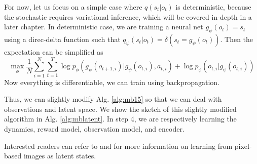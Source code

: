 For now, let us focus on a simple case where $q(s_t|o_t)$ is deterministic, because the stochastic requires variational inference, which will be covered in-depth in a later chapter. In deterministic case, we are training a neural net $g_\psi(o_t) = s_t$ using a direc-delta function such that $q_\psi(s_t|o_t) = \delta(s_t = g_\psi(o_t))$. Then the expectation can be simplified as
\[
\max_\phi \frac{1}{N}\sum_{i=1}^N\sum_{t=1}^T\log p_\phi(g_\psi(o_{t+1,i})|g_\psi(o_{t,i}),a_{t,i}) + \log p_\phi(o_{t,i}|g_\psi(o_{t,i}))
\]
Now everything is differentiable, we can train using backpropagation. 

Thus, we can slightly modify Alg. \ref{alg:mb15} so that we can deal with observations and latent space. We show the sketch of this slightly modified algorithm in Alg. \ref{alg:mblatent}. In step 4, we are respectively learning the dynamics, reward model, observation model, and encoder.


Interested readers can refer to \cite{watter2015embed} and \cite{zhang2018solar} for more information on learning from pixel-based images as latent states.